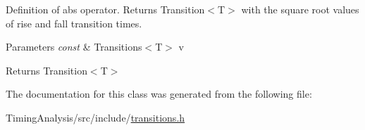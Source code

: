 Definition of abs operator. Returns Transition$<$\-T$>$ with the square root values of rise and fall transition times. 


\begin{DoxyParams}{Parameters}
{\em const} & Transitions$<$\-T$>$ v\\
\hline
\end{DoxyParams}
\begin{DoxyReturn}{Returns}
Transition$<$\-T$>$ 
\end{DoxyReturn}


The documentation for this class was generated from the following file\-:\begin{DoxyCompactItemize}
\item 
Timing\-Analysis/src/include/\hyperlink{transitions_8h}{transitions.\-h}\end{DoxyCompactItemize}
